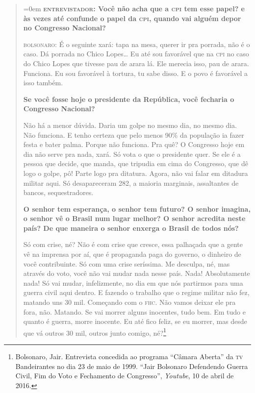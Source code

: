 \begin{quote}\parindent=0em
\textbf{\textsc{entrevistador}: Você não acha que a \textsc{cpi} tem esse papel? e às
vezes até confunde o papel da \textsc{cpi}, quando vai alguém depor no Congresso
Nacional?}

\textsc{bolsonaro}: É o seguinte xará: tapa na mesa, querer ir pra
porrada, não é o caso. Dá porrada no Chico Lopes\ldots{} Eu até sou favorável
que na \textsc{cpi} no caso do Chico Lopes que tivesse pau de arara lá. Ele
merecia isso, pau de arara. Funciona. Eu sou favorável à tortura, tu
sabe disso. E o povo é favorável a isso também.

\medskip

\noindent\textbf{Se você fosse hoje o presidente da República,
você fecharia o Congresso Nacional?}

Não há a menor dúvida. Daria um golpe no mesmo dia,
no mesmo dia. Não funciona. E tenho certeza que pelo menos 90\% da
população ia fazer festa e bater palma. Porque não funciona. Pra quê? O
Congresso hoje em dia não serve pra nada, xará. Só vota o que o
presidente quer. Se ele é a pessoa que decide, que manda, que tripudia
em cima do Congresso, que dê logo o golpe, pô! Parte logo pra ditatura.
Agora, não vai falar em ditadura militar aqui. Só desapareceram 282, a
maioria marginais, assaltantes de bancos, sequestradores.

\medskip

\noindent\textbf{O senhor tem esperança, o senhor tem futuro? O
senhor imagina, o senhor vê o Brasil num lugar melhor? O senhor acredita
neste país? De que maneira o senhor enxerga o Brasil de todos nós?}

Só com crise, né? Não é com crise que cresce, essa
palhaçada que a gente vê na imprensa por aí, que é propaganda paga do
governo, o dinheiro de você contribuinte. Só com uma crise seríssima. Me
desculpa, né, mas através do voto, você não vai mudar nada nesse país.
Nada! Absolutamente nada! Só vai mudar, infelizmente, no dia em que nós
partirmos para uma guerra civil aqui dentro. E fazendo o trabalho que o
regime militar não fez, matando uns 30 mil. Começando com o \textsc{fhc}. Não
vamos deixar ele pra fora, não. Matando. Se vai morrer alguns inocentes,
tudo bem. Em tudo e quanto é guerra, morre inocente. Eu até fico feliz,
se eu morrer, mas desde que vá outros 30 mil, outros junto comigo,
né?\footnote{Bolsonaro, Jair. Entrevista concedida ao programa ``Câmara
  Aberta'' da \textsc{tv} Bandeirantes no dia 23 de maio de 1999. ``Jair Bolsonaro Defendendo Guerra Civil, Fim do Voto e Fechamento de Congresso'', \textit{Youtube}, 10 de abril de 2016.}
\end{quote}

